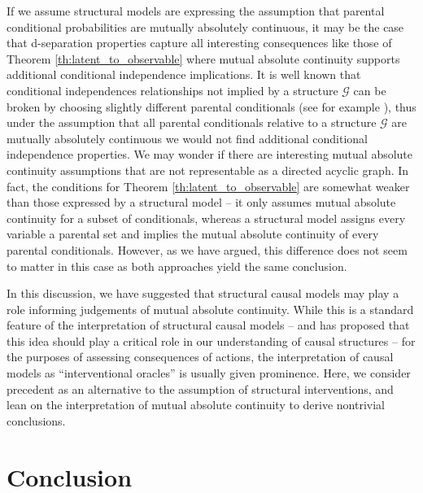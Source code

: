 If we assume structural models are expressing the assumption that parental conditional probabilities are mutually absolutely continuous, it may be the case that d-separation properties capture all interesting consequences like those of Theorem \ref{th:latent_to_observable} where mutual absolute continuity supports additional conditional independence implications. It is well known that conditional independences relationships not implied by a structure $\mathcal{G}$ can be broken by choosing slightly different parental conditionals (see for example \citet{meek_strong_1995,zhang_strong_2003}), thus under the assumption that all parental conditionals relative to a structure $\mathcal{G}$ are mutually absolutely continuous we would not find additional conditional independence properties. We may wonder if there are interesting mutual absolute continuity assumptions that are not representable as a directed acyclic graph. In fact, the conditions for Theorem \ref{th:latent_to_observable} are somewhat weaker than those expressed by a structural model -- it only assumes mutual absolute continuity for a subset of conditionals, whereas a structural model assigns every variable a parental set and implies the mutual absolute continuity of every parental conditionals. However, as we have argued, this difference does not seem to matter in this case as both approaches yield the same conclusion.

In this discussion, we have suggested that structural causal models may play a role informing judgements of mutual absolute continuity. While this is a standard feature of the interpretation of structural causal models -- and \citet{lemeire_replacing_2013} has proposed that this idea should play a critical role in our understanding of causal structures -- for the purposes of assessing consequences of actions, the interpretation of causal models as ``interventional oracles'' \citep[Section 1.3.1]{pearl_causality:_2009} is usually given prominence. Here, we consider precedent as an alternative to the assumption of structural interventions, and lean on the interpretation of mutual absolute continuity to derive nontrivial conclusions.

\section{Conclusion}

